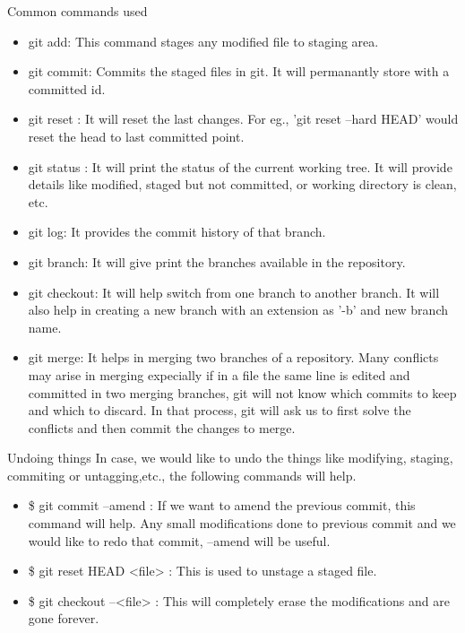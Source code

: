 \documentclass{article}
\begin{document}
\begin{section}{Common commands used}
\begin{itemize}
\item git add: This command stages any modified file to staging area.
\item git commit: Commits the staged files in git. It will permanantly store with a committed id.
\item git reset : It will reset the last changes. For eg., 'git reset --hard HEAD' would reset the head to last committed point.
\item git status : It will print the status of the current working tree. It will provide details like modified, staged but not committed, or working directory is clean, etc.
\item git log: It provides the commit history of that branch. 
\item git branch: It will give print the branches available in the repository.
\item git checkout: It will help switch from one branch to another branch. It will also help in creating a new branch with an extension as '-b' and new branch name.
\item git merge: It helps in merging two branches of a repository. Many conflicts may arise in merging expecially if in a file the same line is edited and committed in two merging branches, git will not know which commits to keep and which to discard. In that process, git will ask us to first solve the conflicts and then commit the changes to merge.

\end{itemize}
\end{section}

\begin{section}{Undoing things}
In case, we would like to undo the things like modifying, staging, commiting or untagging,etc., the following commands will help.
\begin{itemize}
\item \$ git commit --amend : If we want to amend the previous commit, this command will help. Any small modifications done to previous commit and we would like to redo that commit, --amend will be useful.
\item \$ git reset HEAD <file> : This is used to unstage a staged file.
\item \$ git checkout --<file> : This will completely erase the modifications and are gone forever.
\end{itemize}
\end{section}
\end{document}
